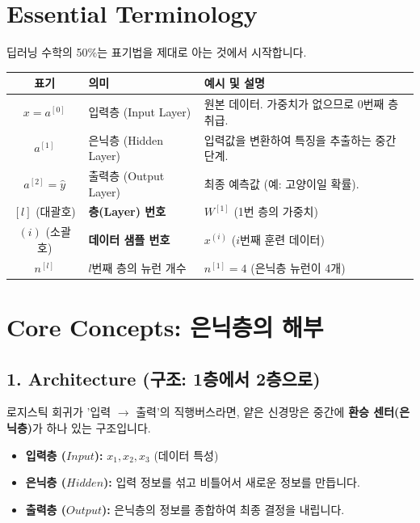 \documentclass[11pt,a4paper]{book}
\theoremstyle{definition}
\begin{document}
\section{Essential Terminology}
딥러닝 수학의 50\%는 표기법을 제대로 아는 것에서 시작합니다.

\begin{center}
\begin{tabular}{|c|l|l|}
\hline
\textbf{표기} & \textbf{의미} & \textbf{예시 및 설명} \\ \hline
$x = a^{[0]}$ & 입력층 (Input Layer) & 원본 데이터. 가중치가 없으므로 0번째 층 취급. \\ \hline
$a^{[1]}$ & 은닉층 (Hidden Layer) & 입력값을 변환하여 특징을 추출하는 중간 단계. \\ \hline
$a^{[2]} = \hat{y}$ & 출력층 (Output Layer) & 최종 예측값 (예: 고양이일 확률). \\ \hline
$[l]$ (대괄호) & \textbf{층(Layer) 번호} & $W^{[1]}$ (1번 층의 가중치) \\ \hline
$(i)$ (소괄호) & \textbf{데이터 샘플 번호} & $x^{(i)}$ ($i$번째 훈련 데이터) \\ \hline
$n^{[l]}$ & $l$번째 층의 뉴런 개수 & $n^{[1]} = 4$ (은닉층 뉴런이 4개) \\ \hline
\end{tabular}
\end{center}

\section{Core Concepts: 은닉층의 해부}

\subsection{1. Architecture (구조: 1층에서 2층으로)}
로지스틱 회귀가 '입력 $\to$ 출력'의 직행버스라면, 얕은 신경망은 중간에 \textbf{환승 센터(은닉층)}가 하나 있는 구조입니다.


\begin{itemize}
    \item \textbf{입력층 ($Input$):} $x_1, x_2, x_3$ (데이터 특성)
    \item \textbf{은닉층 ($Hidden$):} 입력 정보를 섞고 비틀어서 새로운 정보를 만듭니다.
    \item \textbf{출력층 ($Output$):} 은닉층의 정보를 종합하여 최종 결정을 내립니다.
\end{itemize}
\end{document}
